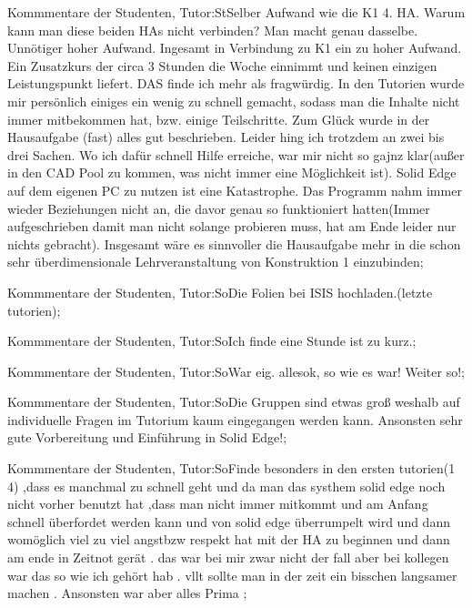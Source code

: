 \documentclass[10pt]{beamer}
\begin{document}
\begin{frame}[fragile]{Kommmentare der Studenten, Tutor:St}Selber Aufwand wie die K1 4. HA. Warum kann man diese beiden HAs nicht verbinden? Man macht genau dasselbe. Unnötiger hoher Aufwand. Ingesamt in Verbindung zu K1 ein zu hoher Aufwand. Ein Zusatzkurs der circa 3 Stunden die Woche einnimmt und keinen einzigen Leistungspunkt liefert. DAS finde ich mehr als fragwürdig.  In den Tutorien wurde mir persönlich einiges ein wenig zu schnell gemacht, sodass man die Inhalte nicht immer mitbekommen hat, bzw. einige Teilschritte. Zum Glück wurde in der Hausaufgabe (fast) alles gut beschrieben. Leider hing ich trotzdem an zwei bis drei Sachen. Wo ich dafür schnell Hilfe erreiche, war mir nicht so gajnz klar(außer in den CAD Pool zu kommen, was nicht immer eine Möglichkeit ist). Solid Edge auf dem eigenen PC zu nutzen ist eine Katastrophe. Das Programm nahm immer wieder Beziehungen nicht an, die davor genau so funktioniert hatten(Immer aufgeschrieben damit man nicht solange probieren muss, hat am Ende leider nur nichts gebracht). Insgesamt wäre es sinnvoller die Hausaufgabe mehr in die schon sehr überdimensionale Lehrveranstaltung von Konstruktion 1 einzubinden;
 \end{frame}
\begin{frame}[fragile]{Kommmentare der Studenten, Tutor:So}Die Folien bei ISIS hochladen.(letzte tutorien);
 \end{frame}
\begin{frame}[fragile]{Kommmentare der Studenten, Tutor:So}Ich finde eine Stunde ist zu kurz.;
 \end{frame}
\begin{frame}[fragile]{Kommmentare der Studenten, Tutor:So}War eig. allesok, so wie es war!
 Weiter so!;
 \end{frame}
\begin{frame}[fragile]{Kommmentare der Studenten, Tutor:So}Die Gruppen sind etwas groß weshalb auf individuelle Fragen im Tutorium kaum eingegangen werden kann. Ansonsten sehr gute Vorbereitung und Einführung in Solid Edge!;
 \end{frame}
\begin{frame}[fragile]{Kommmentare der Studenten, Tutor:So}Finde besonders in den ersten tutorien(1 4) ,dass es manchmal zu schnell geht und da man das systhem solid edge noch nicht vorher benutzt hat ,dass man nicht immer mitkommt und am Anfang schnell überfordet werden kann und von solid edge überrumpelt wird und dann womöglich viel zu viel angstbzw respekt  hat mit der HA zu beginnen und dann am ende in Zeitnot gerät . das war bei mir zwar nicht der fall aber bei kollegen war das so wie ich gehört hab . vllt sollte man in der zeit ein bisschen langsamer machen . Ansonsten war aber alles Prima ;
 \end{frame}
\end{document}

